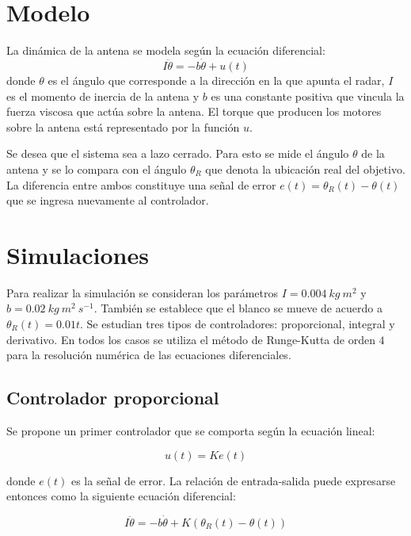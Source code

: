 \documentclass{sig-alternate}
\begin{document}
\section{Modelo}\label{modelo}
La din\'{a}mica de la antena se modela seg\'{u}n la ecuaci\'{o}n diferencial:
\begin{equation}
\label{dinamica_antena}
I \ddot\theta = - b \dot\theta + u(t)
\end{equation}
donde $\theta$ es el \'{a}ngulo que corresponde a la direcci\'{o}n en la que
apunta el radar, $I$ es el momento de inercia de la antena y $b$ es una 
constante positiva que vincula la fuerza viscosa que act\'{u}a sobre la antena.
El torque que producen los motores sobre la antena est\'{a} representado por 
la funci\'{o}n $u$.

Se desea que el sistema sea a lazo cerrado. Para esto se mide el \'{a}ngulo
$\theta$ de la antena y se lo compara con el \'{a}ngulo $\theta_{R}$ que denota
la ubicaci\'{o}n real del objetivo. La diferencia entre ambos constituye una
se\~{n}al de error $e(t) = \theta_{R}(t) - \theta(t)$ que se ingresa nuevamente 
al controlador.

\section{Simulaciones}\label{simulaciones}
Para realizar la simulaci\'{o}n se consideran los par\'{a}metros 
$I = 0.004\ kg\ m^{2}$ y $b = 0.02\ kg\  m^{2}\ s^{-1}$. Tambi\'{e}n se establece
que el blanco se mueve de acuerdo a $\theta_{R}(t) = 0.01 t$.
Se estudian tres tipos de controladores: proporcional, integral y derivativo.
En todos los casos se utiliza el m\'{e}todo de Runge-Kutta de orden $4$ para
la resoluci\'{o}n num\'{e}rica de las ecuaciones diferenciales.

\subsection{Controlador proporcional}\label{proporcional}
Se propone un primer controlador que se comporta seg\'{u}n la 
ecuaci\'{o}n lineal:

\begin{equation}
\label{error_modelo}
u(t) = K e(t)
\end{equation}

donde $e(t)$ es la se\~{n}al de error. La relaci\'{o}n de entrada-salida 
puede expresarse entonces como la siguiente ecuaci\'{o}n diferencial:

\begin{equation}
\label{ecuacion_modelo1}
I \ddot\theta = - b \dot\theta + K(\theta_R(t) - \theta(t))
\end{equation}
\end{document}
